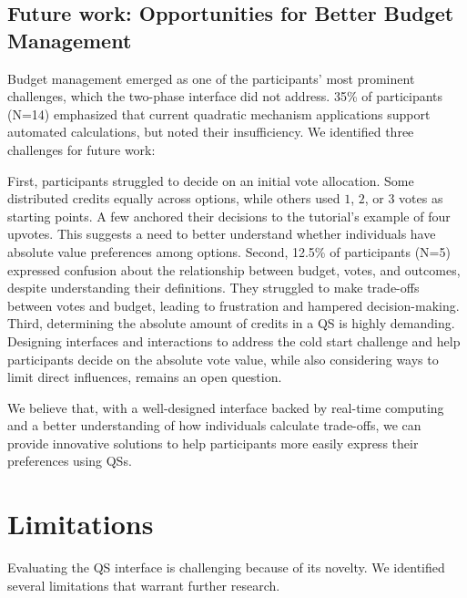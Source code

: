 \subsection{Future work: Opportunities for Better Budget Management}
Budget management emerged as one of the participants' most prominent challenges, which the two-phase interface did not address. 35\% of participants (N=14) emphasized that current quadratic mechanism applications support automated calculations, but noted their insufficiency. We identified three challenges for future work:

First, participants struggled to decide on an initial vote allocation. Some distributed credits equally across options, while others used $1$, $2$, or $3$ votes as starting points. A few anchored their decisions to the tutorial's example of four upvotes. This suggests a need to better understand whether individuals have absolute value preferences among options. Second, 12.5\% of participants (N=5) expressed confusion about the relationship between budget, votes, and outcomes, despite understanding their definitions. They struggled to make trade-offs between votes and budget, leading to frustration and hampered decision-making. Third, determining the absolute amount of credits in a QS is highly demanding. Designing interfaces and interactions to address the cold start challenge and help participants decide on the absolute vote value, while also considering ways to limit direct influences, remains an open question.

We believe that, with a well-designed interface backed by real-time computing and a better understanding of how individuals calculate trade-offs, we can provide innovative solutions to help participants more easily express their preferences using QSs.

\section{Limitations}
\label{sec:limitations}
Evaluating the QS interface is challenging because of its novelty. We identified several limitations that warrant further research.

